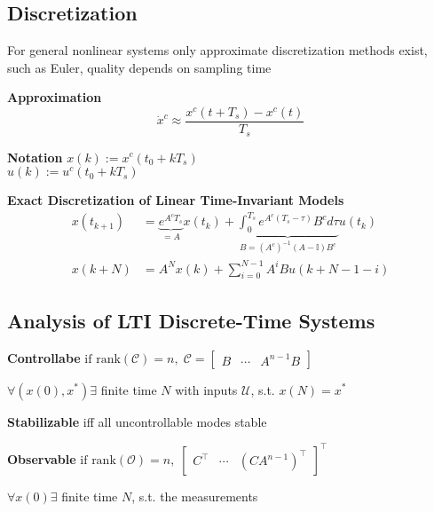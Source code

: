 
\subsection{Discretization}

For general nonlinear systems only approximate discretization methods
exist, such as Euler, quality depends on sampling time

\begin{minipage}[c]{0.5\linewidth}
	\textbf{Approximation}\\
	\[
		\dot{x}^c \approx \frac{x^c(t + T_s)-x^c(t)}{T_s}
	\]
\end{minipage}
\begin{minipage}[c]{0.45\linewidth}
	\center\textbf{Notation}
	$x(k):= x^c(t_0+kT_s)$\\
	$u(k):= u^c(t_0+kT_s)$\\
\end{minipage}
\textbf{Exact Discretization of Linear Time-Invariant Models}
\[\begin{aligned}
		x(t_{k+1}) & =
		\underbrace{e^{A^c T_s}}
		_{=A} x(t_k) +
		\underbrace{\textstyle\int_{0}^{T_s}
			e^{A^c(T_s - \tau)}B^c d\tau}
		_{B=(A^c)^{-1}(A-\mathbb{I})B^c} u(t_k)
		\\
		x(k+N)     & = A^N x(k) + \textstyle\sum_{i=0}^{N-1}
		A^i B u(k+N-1-i)
	\end{aligned} \]

\subsection{Analysis of LTI Discrete-Time Systems}



\textbf{Controllabe}
$
	\text{if rank}(\mathcal{C}) = n
	,\;
	\mathcal{C} =
	\begin{bmatrix}
		B & \cdots & A^{n-1} B
	\end{bmatrix}
$

$\forall(x(0),x^*)\exists$ finite time $N$
with inputs $\mathcal{U}$, s.t. $x(N)=x^*$

\textbf{Stabilizable} iff all uncontrollable modes stable

\textbf{Observable}
$
	\text{if rank}(\mathcal{O}) = n
	,\;
	\begin{bmatrix}
		C^\top & \cdots & (CA^{n-1})^\top
	\end{bmatrix}^\top
$

$\forall x(0)\exists$ finite time $N$, s.t. the measurements

